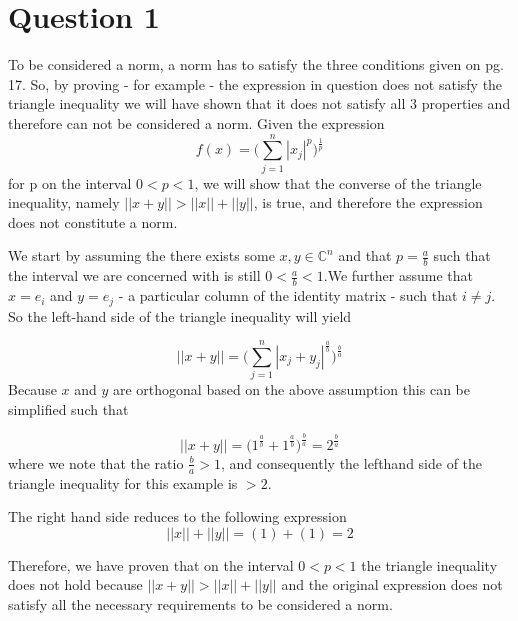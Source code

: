 \documentclass[a4paper,12pt]{article}
\begin{document}
\section{Question 1}

To be considered a norm, a norm has to satisfy the three conditions given on pg. 17. So, by proving - for example - the expression in question does not satisfy the triangle inequality we will have shown that it does not satisfy all 3 properties and therefore can not be considered a norm. Given the expression 
\begin{equation}
f(x) = \big( \sum_{j=1}^n | x_j|^p\big)^{\frac{1}{p}}
\end{equation}
 for p on the interval $0<p<1$, we will show that the converse of the triangle inequality, namely $|| x + y || > ||x||+ ||y||$, is true, and therefore the expression does not constitute a norm. 

We start by assuming the there exists some $x,y \in \mathbb{C}^n$ and that $p=\frac{a}{b}$ such that the interval we are concerned with is still $0<\frac{a}{b}<1$.We further assume that $x=e_i$ and $y=e_j$ - a particular column of the identity matrix - such that $i \neq j$. So the left-hand side of the triangle inequality will yield

\begin{equation}
|| x + y || = \bigg( \sum_{j=1}^n | x_j + y_j |^{\frac{a}{b}}\bigg)^{\frac{b}{a}}
\end{equation}
Because $x$ and $y$ are orthogonal based on the above assumption this can be simplified such that

\begin{equation}
|| x + y || = \bigg( 1^{\frac{a}{b}} + 1^{\frac{a}{b}} \bigg)^{\frac{b}{a}}= 2^{\frac{b}{a}}
\end{equation}
where we note that the ratio $\frac{b}{a}>1$, and consequently the lefthand side of the triangle inequality for this example is $>2$.

The right hand side reduces to the following expression
\begin{equation}
|| x || + || y || = (1) + (1) = 2
\end{equation}

Therefore, we have proven that on the interval $0<p<1$ the triangle inequality does not hold because $|| x + y || > ||x||+ ||y||$ and the original expression does not satisfy all the necessary requirements to be considered a norm. 
\end{document}
